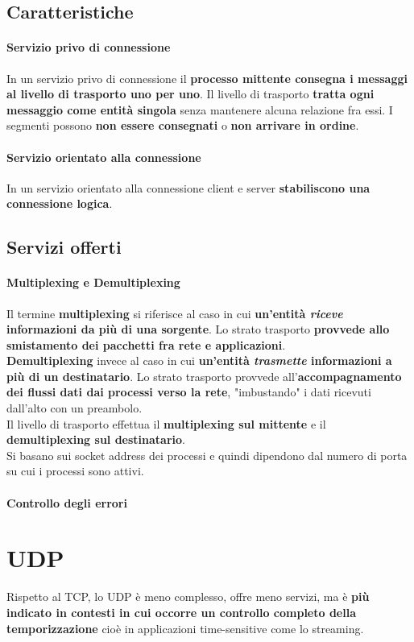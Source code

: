 \documentclass[10pt]{article}
\begin{document}
\subsection{Caratteristiche}
\paragraph{Servizio privo di connessione} In un servizio privo di connessione il \textbf{processo mittente consegna i messaggi al livello di trasporto uno per uno}. Il livello di trasporto \textbf{tratta ogni messaggio come entità singola} senza mantenere alcuna relazione fra essi. I segmenti possono \textbf{non essere consegnati} o \textbf{non arrivare in ordine}.
\paragraph{Servizio orientato alla connessione} In un servizio orientato alla connessione client e server \textbf{stabiliscono una connessione logica}.
\subsection{Servizi offerti}
\paragraph{Multiplexing e Demultiplexing} Il termine \textbf{multiplexing} si riferisce al caso in cui \textbf{un'entità \textit{riceve} informazioni da più di una sorgente}. Lo strato trasporto \textbf{provvede allo smistamento dei pacchetti fra rete e applicazioni}.\\\textbf{Demultiplexing} invece al caso in cui \textbf{un'entità \textit{trasmette} informazioni a più di un destinatario}. Lo strato trasporto provvede all'\textbf{accompagnamento dei flussi dati dai processi verso la rete}, "imbustando" i dati ricevuti dall'alto con un preambolo.\\
Il livello di trasporto effettua il \textbf{multiplexing sul mittente} e il \textbf{demultiplexing sul destinatario}.\\
Si basano sui socket address dei processi e quindi dipendono dal numero di porta su cui i processi sono attivi.
\paragraph{Controllo degli errori}
\section{UDP}
Rispetto al TCP, lo UDP è meno complesso, offre meno servizi, ma è \textbf{più indicato in contesti in cui occorre un controllo completo della temporizzazione} cioè in applicazioni time-sensitive come lo streaming.
\end{document}
